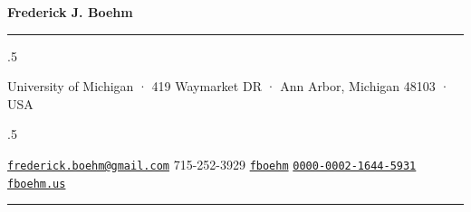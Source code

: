 \documentclass[
  12pt,
]
{article}
\begin{document}
\centerline{\huge \bf Frederick J. Boehm}

\vspace{2 mm}

\hrule

\vspace{2 mm}


\moveleft.5\hoffset\centerline{University of Michigan · 419 Waymarket DR
· Ann Arbor, Michigan 48103 · USA}
\moveleft.5\hoffset\centerline{ \faEnvelopeO \hspace{1 mm} \href{mailto:}{\tt frederick.boehm@gmail.com} \hspace{1 mm}  \faPhone \hspace{1 mm}  715-252-3929  \hspace{1 mm}  \faGithub \hspace{1 mm} \href{http://github.com/fboehm}{\tt fboehm} \hspace{1 mm}      \hspace{.5 mm} \href{https://orcid.org/0000-0002-1644-5931}{\tt 0000-0002-1644-5931} \hspace{1 mm}  \faGlobe \hspace{1 mm} \href{http://fboehm.us}{\tt fboehm.us}   }



\vspace{2 mm}

\hrule
\end{document}
